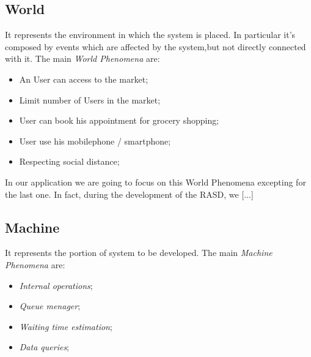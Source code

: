 \subsection{World}

It represents the environment in which the system is placed. In particular it's composed by events which are affected by the system,but not directly connected with it.
The main \textit{World Phenomena} are:

\begin{itemize}
\item An User can access to the market;
\item Limit number of Users in the market;
\item User can book his appointment for grocery shopping;
\item User use his mobilephone / smartphone;
\item Respecting social distance;
\end{itemize}

In our application we are going to focus on this World Phenomena excepting for the last one. In fact, during the development of the RASD, we [...]

\subsection{Machine}
It represents the portion of system to be developed.
The main \textit{Machine Phenomena} are:
\begin{itemize}
\item \textit{Internal operations};
\item \textit{Queue menager};
\item \textit{Waiting time estimation};
\item \textit{Data queries};
\end{itemize}

